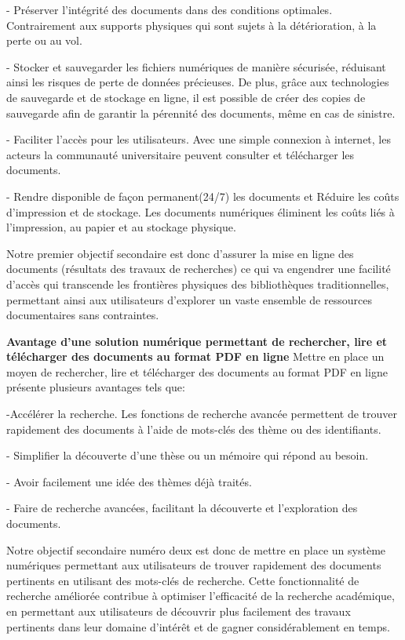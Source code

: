 	- Préserver l'intégrité des documents dans des conditions optimales. Contrairement aux supports physiques qui sont sujets à la détérioration, à la perte ou au vol.\par
	- Stocker et sauvegarder les fichiers numériques de manière sécurisée, réduisant ainsi les risques de perte de données précieuses. De plus, grâce aux technologies de sauvegarde et de stockage en ligne, il est possible de créer des copies de sauvegarde afin de garantir la pérennité des documents, même en cas de sinistre.\par

	- Faciliter l’accès pour les utilisateurs. Avec une simple connexion à internet, les acteurs la communauté universitaire peuvent consulter et télécharger les documents.\par
	- Rendre disponible de façon permanent(24/7) les documents et Réduire les coûts d'impression et de stockage. Les documents numériques éliminent les coûts liés à l'impression, au papier et au stockage physique.
  
Notre premier objectif secondaire est donc d’assurer la mise en ligne des documents (résultats des travaux de recherches) ce qui va engendrer une facilité d'accès qui transcende les frontières physiques des bibliothèques traditionnelles, permettant ainsi aux utilisateurs d'explorer un vaste ensemble de ressources documentaires sans contraintes.

\textbf{Avantage d'une solution numérique permettant de rechercher, lire et télécharger des documents au format PDF en ligne}
 Mettre en place un moyen de rechercher, lire et télécharger des documents au format PDF en ligne présente plusieurs avantages tels que: \par
 -Accélérer la recherche. Les fonctions de recherche avancée permettent de trouver rapidement des documents à l'aide de mots-clés des thème ou des identifiants.\par 
 
 - Simplifier la découverte d'une thèse ou un mémoire qui répond au besoin.\par
 
 - Avoir facilement une idée des thèmes déjà traités.
 
 - Faire de recherche avancées, facilitant la découverte et l'exploration des documents. \par
 
	Notre objectif secondaire numéro deux est donc de mettre en place un système numériques permettant aux utilisateurs de trouver rapidement des documents pertinents en utilisant des mots-clés de recherche. Cette fonctionnalité de recherche améliorée contribue à optimiser l'efficacité de la recherche académique, en permettant aux utilisateurs de découvrir plus facilement des travaux pertinents dans leur domaine d'intérêt et de gagner considérablement en temps.\par



